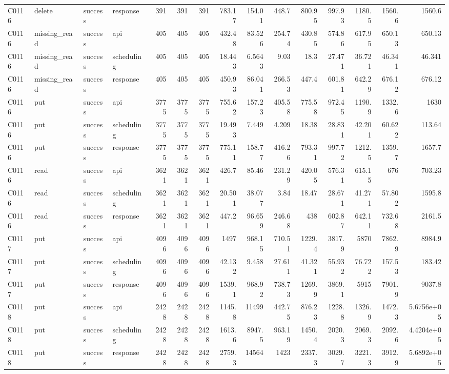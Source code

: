 \begin{landscape}
\begin{longtable}{llllrrrrrrrrrrr}
C0116 & delete & success & response & 391 & 391 & 391 & 783.17 & 154.01 & 448.7 & 800.95 & 997.93 & 1180.5 & 1560.6 & 1560.6\\
C0116 & missing\_\allowbreak{}read & success & api & 405 & 405 & 405 & 432.48 & 83.526 & 254.74 & 430.85 & 574.86 & 617.95 & 650.13 & 650.13\\
C0116 & missing\_\allowbreak{}read & success & scheduling & 405 & 405 & 405 & 18.443 & 6.5643 & 9.03 & 18.3 & 27.471 & 36.721 & 46.341 & 46.341\\
C0116 & missing\_\allowbreak{}read & success & response & 405 & 405 & 405 & 450.93 & 86.041 & 266.53 & 447.4 & 601.81 & 642.29 & 676.12 & 676.12\\
C0116 & put & success & api & 3775 & 3775 & 3775 & 755.62 & 157.23 & 405.58 & 775.58 & 972.45 & 1190.9 & 1332.6 & 1630\\
C0116 & put & success & scheduling & 3775 & 3775 & 3775 & 19.493 & 7.449 & 4.209 & 18.38 & 28.831 & 42.201 & 60.622 & 113.64\\
C0116 & put & success & response & 3775 & 3775 & 3775 & 775.11 & 158.77 & 416.26 & 793.31 & 997.72 & 1212.5 & 1359.7 & 1657.7\\
C0116 & read & success & api & 3621 & 3621 & 3621 & 426.7 & 85.46 & 231.29 & 420.05 & 576.31 & 615.15 & 676 & 703.23\\
C0116 & read & success & scheduling & 3621 & 3621 & 3621 & 20.501 & 38.077 & 3.84 & 18.47 & 28.671 & 41.271 & 57.802 & 1595.8\\
C0116 & read & success & response & 3621 & 3621 & 3621 & 447.2 & 96.659 & 246.68 & 438 & 602.87 & 642.11 & 732.68 & 2161.5\\
C0117 & put & success & api & 4096 & 4096 & 4096 & 1497 & 968.15 & 710.51 & 1229.4 & 3817.9 & 5870 & 7862.9 & 8984.9\\
C0117 & put & success & scheduling & 4096 & 4096 & 4096 & 42.132 & 9.458 & 27.611 & 41.321 & 55.932 & 76.722 & 157.53 & 183.42\\
C0117 & put & success & response & 4096 & 4096 & 4096 & 1539.1 & 968.92 & 738.73 & 1269.9 & 3869.1 & 5915 & 7901.9 & 9037.8\\
C0118 & put & success & api & 2428 & 2428 & 2428 & 1145.8 & 11499 & 442.75 & 876.23 & 1228.8 & 1326.9 & 1472.3 & 5.6756e+05\\
C0118 & put & success & scheduling & 2428 & 2428 & 2428 & 1613.6 & 8947.5 & 963.19 & 1450.4 & 2020.3 & 2069.3 & 2092.6 & 4.4204e+05\\
C0118 & put & success & response & 2428 & 2428 & 2428 & 2759.3 & 14564 & 1423 & 2337.3 & 3029.7 & 3221.3 & 3912.9 & 5.6892e+05\\

\end{longtable}
\end{landscape}
